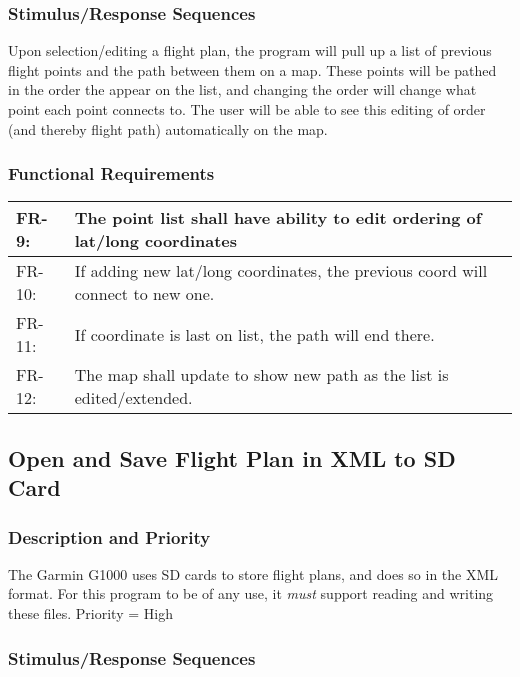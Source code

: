 \documentclass[12pt, letterpaper]{article}
\begin{document}
        \subsubsection{Stimulus/Response Sequences}
            Upon selection/editing a flight plan, the program will pull up a list of previous flight
            points and the path between them on a map. These points will be pathed in the order the
            appear on the list, and changing the order will change what point each point connects to.
            The user will be able to see this editing of order (and thereby flight path) automatically
            on the map.
        \subsubsection{Functional Requirements}
          \begin{tabularx}{\textwidth}{|l|X|} \hline
            FR-9: & The point list shall have ability to edit ordering of lat/long coordinates\\ \hline
            FR-10: & If adding new lat/long coordinates, the previous coord will connect to new one.\\ \hline
            FR-11: & If coordinate is last on list, the path will end there.\\ \hline
      	    FR-12: & The map shall update to show new path as the list is edited/extended.\\ \hline
          \end{tabularx}
        \subsection{Open and Save Flight Plan in XML to SD Card}
          \subsubsection{Description and Priority}
            The Garmin G1000 uses SD cards to store flight plans, and does so in the XML format.
            For this program to be of any use, it \emph{must} support reading and writing these files.
            Priority = High
          \subsubsection{Stimulus/Response Sequences}
\end{document}
